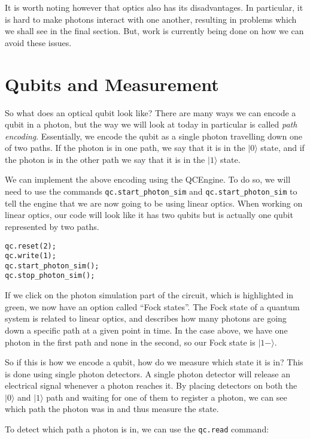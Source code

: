\documentclass[twocolumn]{article}
\begin{document}
It is worth noting however that optics also has its disadvantages. In particular, it is hard to make photons interact with one another, resulting in problems which we shall see in the final section. But, work is currently being done on how we can avoid these issues.

\section{Qubits and Measurement}

So what does an optical qubit look like? There are many ways we can encode a qubit in a photon, but the way we will look at today in particular is called {\em path encoding}. Essentially, we encode the qubit as a single photon travelling down one of two paths. If the photon is in one path, we say that it is in the $|0\rangle$ state, and if the photon is in the other path we say that it is in the $|1\rangle$ state.

We can implement the above encoding using the QCEngine. To do so, we will need to use the commands \texttt{qc.start\_photon\_sim} and \texttt{qc.start\_photon\_sim} to tell the engine that we are now going to be using linear optics. When working on linear optics, our code will look like it has two qubits but is actually one qubit represented by two paths.

\begin{lstlisting}
qc.reset(2);
qc.write(1);
qc.start_photon_sim();
qc.stop_photon_sim();
\end{lstlisting}

If we click on the photon simulation part of the circuit, which is highlighted in green, we now have an option called ``Fock states''. The Fock state of a quantum system is related to linear optics, and describes how many photons are going down a specific path at a given point in time. In the case above, we have one photon in the first path and none in the second, so our Fock state is $|1-\rangle$.

So if this is how we encode a qubit, how do we measure which state it is in? This is done using single photon detectors. A single photon detector will release an electrical signal whenever a photon reaches it. By placing detectors on both the $|0\rangle$ and $|1\rangle$ path and waiting for one of them to register a photon, we can see which path the photon was in and thus measure the state.

To detect which path a photon is in, we can use the \texttt{qc.read} command:
\end{document}
